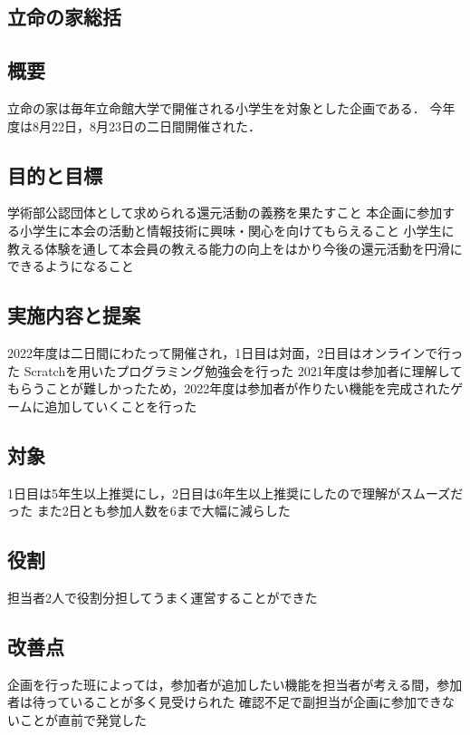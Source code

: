 \subsection*{立命の家総括}


\subsection*{概要}
立命の家は毎年立命館大学で開催される小学生を対象とした企画である．
今年度は8月22日，8月23日の二日間開催された．

\subsection*{目的と目標}
学術部公認団体として求められる還元活動の義務を果たすこと
本企画に参加する小学生に本会の活動と情報技術に興味・関心を向けてもらえること
小学生に教える体験を通して本会員の教える能力の向上をはかり今後の還元活動を円滑にできるようになること

\subsection*{実施内容と提案}
2022年度は二日間にわたって開催され，1日目は対面，2日目はオンラインで行った
Scratchを用いたプログラミング勉強会を行った
2021年度は参加者に理解してもらうことが難しかったため，2022年度は参加者が作りたい機能を完成されたゲームに追加していくことを行った

\subsection*{対象}
1日目は5年生以上推奨にし，2日目は6年生以上推奨にしたので理解がスムーズだった
また2日とも参加人数を6まで大幅に減らした

\subsection*{役割}
担当者2人で役割分担してうまく運営することができた

\subsection*{改善点}
企画を行った班によっては，参加者が追加したい機能を担当者が考える間，参加者は待っていることが多く見受けられた
確認不足で副担当が企画に参加できないことが直前で発覚した
